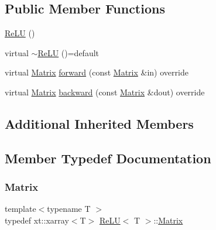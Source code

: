 \subsection*{Public Member Functions}
\begin{DoxyCompactItemize}
\item 
\mbox{\hyperlink{class_re_l_u_ad378d979e537b8af65513b3cb9bfe2b1}{Re\+LU}} ()
\item 
virtual \mbox{\hyperlink{class_re_l_u_a6694b0386daea4398ad932f92382e206}{$\sim$\+Re\+LU}} ()=default
\item 
virtual \mbox{\hyperlink{class_re_l_u_a3d1448f06335a4ab7227ec31a43a410f}{Matrix}} \mbox{\hyperlink{class_re_l_u_aef903f5e7d309e76f49abc34043354ce}{forward}} (const \mbox{\hyperlink{class_re_l_u_a3d1448f06335a4ab7227ec31a43a410f}{Matrix}} \&in) override
\item 
virtual \mbox{\hyperlink{class_re_l_u_a3d1448f06335a4ab7227ec31a43a410f}{Matrix}} \mbox{\hyperlink{class_re_l_u_aa634f43909614b979d84f5d4e5480bb4}{backward}} (const \mbox{\hyperlink{class_re_l_u_a3d1448f06335a4ab7227ec31a43a410f}{Matrix}} \&dout) override
\end{DoxyCompactItemize}
\subsection*{Additional Inherited Members}


\subsection{Member Typedef Documentation}
\mbox{\label{class_re_l_u_a3d1448f06335a4ab7227ec31a43a410f}} 
\subsubsection{\texorpdfstring{Matrix}{Matrix}}
{\footnotesize\ttfamily template$<$typename T $>$ \\
typedef xt\+::xarray$<$T$>$ \mbox{\hyperlink{class_re_l_u}{Re\+LU}}$<$ T $>$\+::\mbox{\hyperlink{class_re_l_u_a3d1448f06335a4ab7227ec31a43a410f}{Matrix}}}

\mbox{\label{class_re_l_u_ae27e6aba0a09baa85b8ef8679db42719}} 
